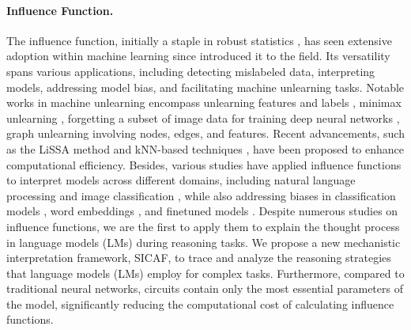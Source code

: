 \paragraph{Influence Function.} The influence function, initially a staple in robust statistics \citep{cook2000detection,cook1980characterizations}, has seen extensive adoption within machine learning since \citet{koh2017understanding} introduced it to the field. Its versatility spans various applications, including detecting mislabeled data, interpreting models, addressing model bias, and facilitating machine unlearning tasks. Notable works in machine unlearning encompass unlearning features and labels \citep{warnecke2021machine}, minimax unlearning \citep{liu2024certified}, forgetting a subset of image data for training deep neural networks \citep{golatkar2020eternal,golatkar2021mixed}, graph unlearning involving nodes, edges, and features. Recent advancements, such as the LiSSA method \citep{agarwal2017second,kwon2023datainf} and kNN-based techniques \citep{guo2021fastif}, have been proposed to enhance computational efficiency. Besides, various studies have applied influence functions to interpret models across different domains, including natural language processing \citep{han2020explaining} and image classification \citep{basu2021influence}, while also addressing biases in classification models \citep{wang2019repairing}, word embeddings \citep{brunet2019understanding}, and finetuned models \citep{chen2020multi}. Despite numerous studies on influence functions, we are the first to apply them to explain the thought process in language models (LMs) during reasoning tasks. We propose a new mechanistic interpretation framework, SICAF, to trace and analyze the reasoning strategies that language models (LMs) employ for complex tasks. Furthermore, compared to traditional neural networks, circuits contain only the most essential parameters of the model, significantly reducing the computational cost of calculating influence functions.